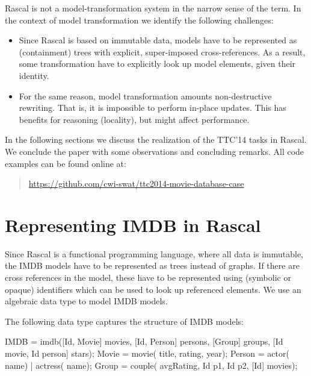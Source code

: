 \documentclass[submission,copyright,creativecommons]{eptcs}
\begin{document}
Rascal is not a model-transformation system in the narrow sense of the term. In the context of model transformation we identify the following challenges:
\begin{itemize}
\item Since Rascal is based on immutable data, models have to be represented as (containment) trees with explicit, super-imposed cross-references. As a result, some transformation have to explicitly look up model elements, given their identity. 
\item For the same reason, model transformation amounts  non-destructive rewriting. That is, it is impossible to perform in-place updates. This has benefits for reasoning (locality), but might affect performance.
\end{itemize}
In the following sections we discuss the realization of the TTC'14 tasks in Rascal. We conclude the paper with some observations and concluding remarks. 
All code examples  can be found  online at:
\begin{quote}
\url{https://github.com/cwi-swat/ttc2014-movie-database-case}
\end{quote}


\section*{Representing IMDB in Rascal}

Since Rascal is a functional programming language, where all data is immutable, the IMDB models have to be represented as trees instead of graphs. If there are cross references in the model, these have to be represented using (symbolic or opaque) identifiers which can be used to look up referenced elements. We use an algebraic data type to model IMDB models. 

The following data type captures the structure of  IMDB models:
\begin{rascal}
 IMDB   = imdb([Id, Movie] movies, [Id, Person] persons, 
                   [Group] groups, [Id movie, Id person] stars);
 Movie  = movie( title,  rating,  year);
 Person = actor( name) | actress( name);
 Group  = couple( avgRating, Id p1, Id p2, [Id] movies);
\end{rascal}
\end{document}
